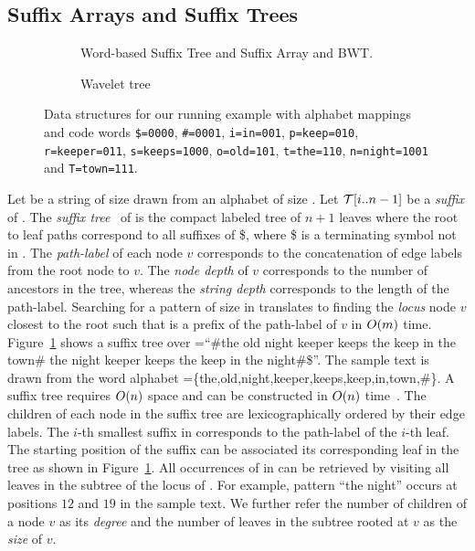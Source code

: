 
\subsection{Suffix Arrays and Suffix Trees}

\begin{figure*}[phbt]
\begin{subfigure}[t]{0.5\textwidth}
\centering

\caption{Word-based Suffix Tree and Suffix Array and BWT.}
\label{fig-suffix-tree}
\end{subfigure}
\quad
\begin{subfigure}[t]{0.5\textwidth}
\centering

\caption{Wavelet tree}
\label{fig-wt-bwt}
\end{subfigure}
\begin{subfigure}[b]{1\textwidth}
\centering

\label{fig-wt-bwt}
\end{subfigure}
\vspace{-0.8cm}
\caption{Data structures for our running example with alphabet mappings and code words {\tt \$=0000}, {\tt \#=0001}, 
{\tt i=in=001}, {\tt p=keep=010}, {\tt r=keeper=011}, {\tt s=keeps=1000}, 
{\tt o=old=101}, {\tt t=the=110}, {\tt n=night=1001} and {\tt T=town=111}.}
\end{figure*}

Let {\col} be a string of size {\collen} drawn from an alphabet {\alphabet} of
size {\alphabetsize}. Let {$\mathcal{T}[i..n-1]$} be a {\it suffix} of {\col}.
The {\it suffix tree}~\cite{w-swat73} of {\col} is the compact labeled
tree of $n+1$ leaves where the root to leaf paths correspond to all suffixes of {\col\$},
where \$ is a terminating symbol not in {\alphabet}. The {\it path-label}
of each node $v$ corresponds to the concatenation of edge labels from the
root node to $v$. The {\it node depth} of $v$ corresponds to the number
of ancestors in the tree, whereas the {\it string depth} corresponds to the
length of the path-label. Searching for a pattern {\pattern} of 
size {\plen} in {\col} translates to finding the {\it locus} node $v$ closest to
the root such that {\pattern} is a prefix of the path-label of $v$ in $O(m)$ time.
Figure~\ref{fig-suffix-tree} shows a suffix tree over {\col=``\#the old night keeper 
keeps the keep in the town\# the night keeper keeps the keep in the night\#\$}''. 
The sample text is drawn from the word alphabet 
{\alphabet=\{the,old,night,keeper,keeps,keep,in,town,\#\}}. A suffix tree requires $O(n)$ space 
and can be constructed in $O(n)$ time~\cite{u-algo95}. The children
of each node in the suffix tree are lexicographically ordered by their edge labels.
The $i$-th smallest suffix in {\col} corresponds to the path-label of the $i$-th 
leaf. The starting position of the suffix can be associated its corresponding
leaf in the tree as shown in Figure~\ref{fig-suffix-tree}. All 
occurrences of {\pattern} in {\col} can be retrieved by visiting all leaves
in the subtree of the locus of {\pattern}. For example, pattern ``the night'' occurs
at positions $12$ and $19$ in the sample text. We further refer the number of children
of a node $v$ as its {\it degree} and the number of leaves in the subtree rooted at $v$
as the {\it size} of $v$.

